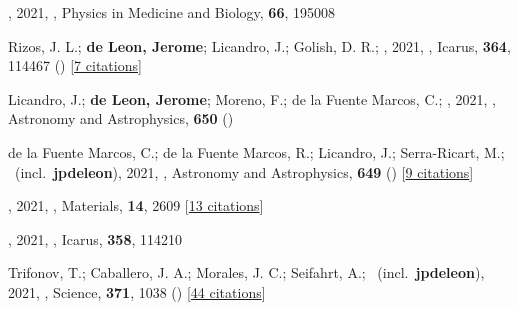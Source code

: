 \item[{\color{numcolor}\scriptsize145}] , 2021, , Physics in Medicine and Biology, \textbf{66}, 195008

\item[{\color{numcolor}\scriptsize144}] Rizos, J. L.; \textbf{de Leon, Jerome}; Licandro, J.; Golish, D. R.; \etal, 2021, , Icarus, \textbf{364}, 114467 () [\href{https://ui.adsabs.harvard.edu/abs/2021Icar..36414467R}{7 citations}]

\item[{\color{numcolor}\scriptsize143}] Licandro, J.; \textbf{de Leon, Jerome}; Moreno, F.; de la Fuente Marcos, C.; \etal, 2021, , Astronomy and Astrophysics, \textbf{650} ()

\item[{\color{numcolor}\scriptsize142}] de la Fuente Marcos, C.; de la Fuente Marcos, R.; Licandro, J.; Serra-Ricart, M.; \etal\ (incl.\ \textbf{jpdeleon}), 2021, , Astronomy and Astrophysics, \textbf{649} () [\href{https://ui.adsabs.harvard.edu/abs/2021A&A...649A..85D}{9 citations}]

\item[{\color{numcolor}\scriptsize141}] , 2021, , Materials, \textbf{14}, 2609 [\href{https://ui.adsabs.harvard.edu/abs/2021Mate...14.2609M}{13 citations}]

\item[{\color{numcolor}\scriptsize140}] , 2021, , Icarus, \textbf{358}, 114210

\item[{\color{numcolor}\scriptsize139}] Trifonov, T.; Caballero, J. A.; Morales, J. C.; Seifahrt, A.; \etal\ (incl.\ \textbf{jpdeleon}), 2021, , Science, \textbf{371}, 1038 () [\href{https://ui.adsabs.harvard.edu/abs/2021Sci...371.1038T}{44 citations}]

